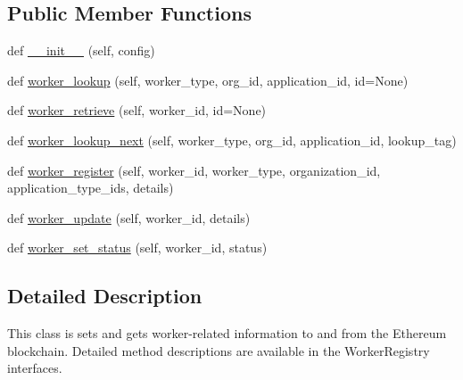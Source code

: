 \subsection*{Public Member Functions}
\begin{DoxyCompactItemize}
\item 
def \hyperlink{classavalon__sdk_1_1connector_1_1blockchains_1_1ethereum_1_1ethereum__worker__registry_1_1EthereumWorkerRegistryImpl_a79413054b91cb2ac4f4f84f9d71164b9}{\+\_\+\+\_\+init\+\_\+\+\_\+} (self, config)
\item 
def \hyperlink{classavalon__sdk_1_1connector_1_1blockchains_1_1ethereum_1_1ethereum__worker__registry_1_1EthereumWorkerRegistryImpl_aabc41cb244ef33226ccaaecb6a84e090}{worker\+\_\+lookup} (self, worker\+\_\+type, org\+\_\+id, application\+\_\+id, id=None)
\item 
def \hyperlink{classavalon__sdk_1_1connector_1_1blockchains_1_1ethereum_1_1ethereum__worker__registry_1_1EthereumWorkerRegistryImpl_ab220c1d0eaad1251422eabd0d5e77012}{worker\+\_\+retrieve} (self, worker\+\_\+id, id=None)
\item 
def \hyperlink{classavalon__sdk_1_1connector_1_1blockchains_1_1ethereum_1_1ethereum__worker__registry_1_1EthereumWorkerRegistryImpl_a6491ee03885089b8d6fcad548d233c8a}{worker\+\_\+lookup\+\_\+next} (self, worker\+\_\+type, org\+\_\+id, application\+\_\+id, lookup\+\_\+tag)
\item 
def \hyperlink{classavalon__sdk_1_1connector_1_1blockchains_1_1ethereum_1_1ethereum__worker__registry_1_1EthereumWorkerRegistryImpl_a2b7e710b8b613e1566918b13f1e85a65}{worker\+\_\+register} (self, worker\+\_\+id, worker\+\_\+type, organization\+\_\+id, application\+\_\+type\+\_\+ids, details)
\item 
def \hyperlink{classavalon__sdk_1_1connector_1_1blockchains_1_1ethereum_1_1ethereum__worker__registry_1_1EthereumWorkerRegistryImpl_a24004184828992ce6ad467362bb00ebf}{worker\+\_\+update} (self, worker\+\_\+id, details)
\item 
def \hyperlink{classavalon__sdk_1_1connector_1_1blockchains_1_1ethereum_1_1ethereum__worker__registry_1_1EthereumWorkerRegistryImpl_a66cd281d07d4dc1f16fb36e31321acb8}{worker\+\_\+set\+\_\+status} (self, worker\+\_\+id, status)
\end{DoxyCompactItemize}


\subsection{Detailed Description}
\begin{DoxyVerb}This class is sets and gets worker-related information to and from
the Ethereum blockchain.
Detailed method descriptions are available in the WorkerRegistry
interfaces.
\end{DoxyVerb}
 

